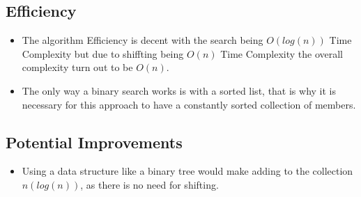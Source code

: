\documentclass{article}
\begin{document}
\subsection{Efficiency}
    
    \begin{itemize}
		\item The algorithm Efficiency is decent with the search being $O(log(n))$ Time Complexity but due to shiffting being $O(n)$ Time Complexity the overall complexity turn out to be $O(n)$.
		\item The only way a binary search works is with a sorted list, that is why it is necessary for this approach to have a constantly sorted collection of members.
    \end{itemize}
    
\subsection{Potential Improvements}
\begin{itemize}
	\item Using a data structure like a binary tree would make adding to the collection $n(log(n))$, as there is no need for shifting.
\end{itemize}


 
\end{document}
